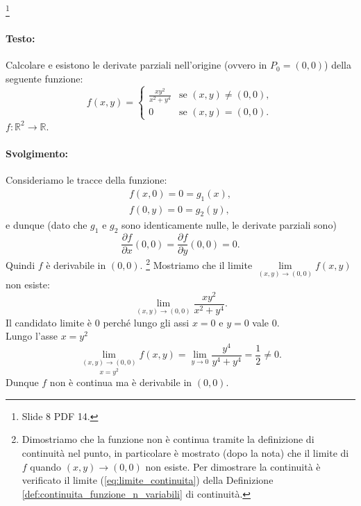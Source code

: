 \begin{example}\footnote{Slide 8 PDF 14.}
    \paragraph{Testo:} Calcolare e esistono le derivate parziali nell'origine (ovvero in $P_0=(0,0)$) della seguente funzione:
    \begin{equation*}
        f(x,y)=
        \begin{cases}
            \frac{xy^2}{x^2+y^4} & \text{se } (x,y)\neq (0,0),\\
            0 & \text{se } (x,y)=(0,0).
        \end{cases}
    \end{equation*}
    $f:\mathbb R^2\rightarrow\mathbb R$.
    \paragraph{Svolgimento:} Consideriamo le tracce della funzione:
    \begin{equation*}
        \begin{matrix}
            f(x,0)=0=g_1(x),\\
            f(0,y)=0=g_2(y),
        \end{matrix}
    \end{equation*}
    e dunque (dato che $g_1$ e $g_2$ sono identicamente nulle, le derivate parziali sono)
    \begin{equation*}
        \frac{\partial f}{\partial x}(0,0)=\frac{\partial f}{\partial y}(0,0)=0.
    \end{equation*}
    Quindi $f$ è derivabile in $(0,0)$. \footnote{Dimostriamo che la funzione non è continua tramite la definizione di continuità nel punto, in particolare è mostrato (dopo la nota) che il limite di $f$ quando $(x,y)\rightarrow (0,0)$ non esiste. Per dimostrare la continuità è verificato il limite (\ref{eq:limite_continuita}) della Definizione \ref{def:continuita_funzione_n_variabili} di continuità.} Mostriamo che il limite $\lim\limits_{(x,y)\rightarrow(0,0)}f(x,y)$ non esiste:
    \begin{equation*}
        \lim\limits_{(x,y)\rightarrow(0,0)}\frac{xy^2}{x^2+y^4}.
    \end{equation*}
    Il candidato limite è 0 perché lungo gli assi $x=0$ e $y=0$ vale 0.\\
    Lungo l'asse $x=y^2$
    \begin{equation*}
        \underset{x=y^2}{\lim\limits_{(x,y)\rightarrow(0,0)}}f(x,y)=\lim\limits_{y\rightarrow 0}\frac{y^4}{y^4+y^4}=\frac{1}{2}\neq 0.
    \end{equation*}
    Dunque $f$ non è continua ma è derivabile in $(0,0)$.
\end{example}

